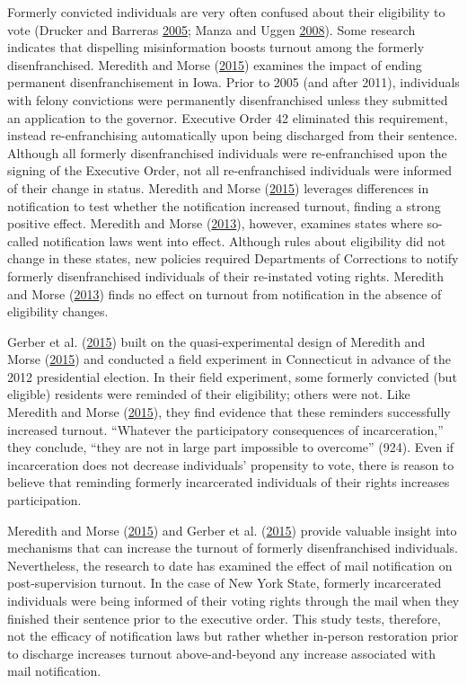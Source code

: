 \documentclass[
  12pt,
]{article}
\begin{document}
Formerly convicted individuals are very often confused about their eligibility to vote (Drucker and Barreras \protect\hyperlink{ref-Drucker2005}{2005}; Manza and Uggen \protect\hyperlink{ref-locked_out}{2008}). Some research indicates that dispelling misinformation boosts turnout among the formerly disenfranchised. Meredith and Morse (\protect\hyperlink{ref-Meredith2015}{2015}) examines the impact of ending permanent disenfranchisement in Iowa. Prior to 2005 (and after 2011), individuals with felony convictions were permanently disenfranchised unless they submitted an application to the governor. Executive Order 42 eliminated this requirement, instead re-enfranchising automatically upon being discharged from their sentence. Although all formerly disenfranchised individuals were re-enfranchised upon the signing of the Executive Order, not all re-enfranchised individuals were informed of their change in status. Meredith and Morse (\protect\hyperlink{ref-Meredith2015}{2015}) leverages differences in notification to test whether the notification increased turnout, finding a strong positive effect. Meredith and Morse (\protect\hyperlink{ref-Meredith2013}{2013}), however, examines states where so-called notification laws went into effect. Although rules about eligibility did not change in these states, new policies required Departments of Corrections to notify formerly disenfranchised individuals of their re-instated voting rights. Meredith and Morse (\protect\hyperlink{ref-Meredith2013}{2013}) finds no effect on turnout from notification in the absence of eligibility changes.

Gerber et al. (\protect\hyperlink{ref-Gerber2015}{2015}) built on the quasi-experimental design of Meredith and Morse (\protect\hyperlink{ref-Meredith2015}{2015}) and conducted a field experiment in Connecticut in advance of the 2012 presidential election. In their field experiment, some formerly convicted (but eligible) residents were reminded of their eligibility; others were not. Like Meredith and Morse (\protect\hyperlink{ref-Meredith2015}{2015}), they find evidence that these reminders successfully increased turnout. ``Whatever the participatory consequences of incarceration,'' they conclude, ``they are not in large part impossible to overcome'' (924). Even if incarceration does not decrease individuals' propensity to vote, there is reason to believe that reminding formerly incarcerated individuals of their rights increases participation.

Meredith and Morse (\protect\hyperlink{ref-Meredith2015}{2015}) and Gerber et al. (\protect\hyperlink{ref-Gerber2015}{2015}) provide valuable insight into mechanisms that can increase the turnout of formerly disenfranchised individuals. Nevertheless, the research to date has examined the effect of mail notification on post-supervision turnout. In the case of New York State, formerly incarcerated individuals were being informed of their voting rights through the mail when they finished their sentence prior to the executive order. This study tests, therefore, not the efficacy of notification laws but rather whether in-person restoration prior to discharge increases turnout above-and-beyond any increase associated with mail notification.
\end{document}
